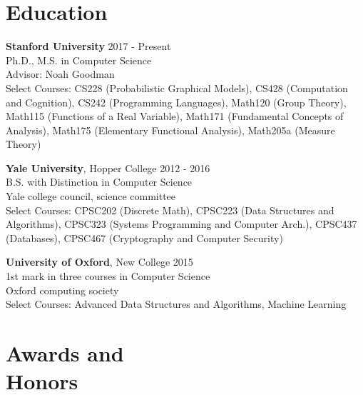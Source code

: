 \documentclass[margin, 10pt]{res} %
\begin{document}
\begin{resume}


\section{Education}

\textbf{Stanford University} \hfill 2017 - Present \\
Ph.D., M.S. in Computer Science \\
Advisor: Noah Goodman \\
Select Courses: CS228 (Probabilistic Graphical Models), CS428 (Computation and Cognition), CS242 (Programming Languages), Math120 (Group Theory), Math115 (Functions of a Real Variable), Math171 (Fundamental Concepts of Analysis), Math175 (Elementary Functional Analysis), Math205a (Measure Theory)

\textbf{Yale University}, Hopper College \hfill 2012 - 2016 \\
B.S. with Distinction in Computer Science \\
Yale college council, science committee \\
Select Courses: CPSC202 (Discrete Math), CPSC223 (Data Structures and Algorithms), CPSC323 (Systems Programming and Computer Arch.), CPSC437 (Databases), CPSC467 (Cryptography and Computer Security)

\textbf{University of Oxford}, New College \hfill 2015 \\
1st mark in three courses in Computer Science\\
Oxford computing society \\
Select Courses: Advanced Data Structures and Algorithms, Machine Learning


\section{Awards and \\ Honors}


\end{resume}
\end{document}
